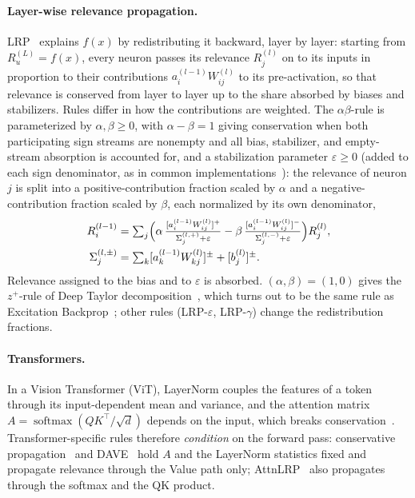 \documentclass[twoside]{article}
\newif\ifch \chfalse
\newcommand{\ch}[1]{\ifch\textcolor{magenta}{#1}\else#1\fi}
\newcommand{\1}{\mathbf{1}}
\DeclareMathOperator{\softmax}{softmax}
\begin{document}
\paragraph{Layer-wise relevance propagation.} \ac{LRP}~\citep{Bach2015} explains $f(x)$ by redistributing it backward, layer by layer: starting
from $R^{(L)}_u = f(x)$, every neuron passes its relevance $R^{(l)}_j$ on to its inputs in
proportion to their contributions $a^{(l-1)}_i W^{(l)}_{ij}$ to its pre-activation, so that
relevance is conserved from layer to layer up to the share absorbed by biases and stabilizers.
Rules differ in how the contributions are weighted. The $\alpha\beta$-rule is parameterized by
$\alpha,\beta\geq0$, with $\alpha-\beta=1$ giving conservation when both participating sign streams are nonempty and all bias, stabilizer, and empty-stream absorption is accounted for, and a
stabilization parameter $\varepsilon \ge 0$ \ch{(added to each sign denominator, as in common
implementations~\citep{Anders2021zennit})}: the relevance of neuron $j$ is split into a
positive-contribution fraction scaled by $\alpha$ and a negative-contribution fraction scaled by
$\beta$, each normalized by its own denominator,
\begin{align}\label{eq:lrp-ab}
    R^{(l-1)}_i &= \textstyle\sum_j \Bigl( \alpha\, \tfrac{[a^{(l-1)}_i
    W^{(l)}_{ij}]^+}{\Sigma^{(l,+)}_j + \varepsilon} - \beta\, \tfrac{[a^{(l-1)}_i
    W^{(l)}_{ij}]^-}{\Sigma^{(l,-)}_j + \varepsilon} \Bigr) R^{(l)}_j, \nonumber\\
    \Sigma^{(l,\pm)}_j &= \textstyle\sum_k [a^{(l-1)}_k W^{(l)}_{kj}]^{\pm} + [b^{(l)}_j]^{\pm}.
\end{align}
Relevance assigned to the bias and to $\varepsilon$ is absorbed. $(\alpha,\beta) = (1,0)$ gives the
$z^+$-rule of Deep Taylor decomposition~\citep{Montavon2017}, which turns out to be the same rule
as Excitation Backprop~\citep{Zhang2018excitation}; other rules (LRP-$\varepsilon$, LRP-$\gamma$)
change the redistribution fractions.

\paragraph{Transformers.} In a Vision Transformer (\acs{ViT}), \ch{LayerNorm couples the features of a token through its
input-dependent mean and variance,} and the attention matrix $A = \softmax(QK^\top/\sqrt{d})$
depends on the input, which breaks conservation~\citep{Ali2022}.
\ch{Transformer-specific rules therefore \emph{condition} on the forward pass: conservative
propagation~\citep{Ali2022} and DAVE~\citep{Wrobel2024} hold $A$ and the LayerNorm statistics fixed
and propagate relevance through the Value path only;
AttnLRP~\citep{achtibat2024attnlrp} also propagates through the softmax and the QK product.}
\end{document}

